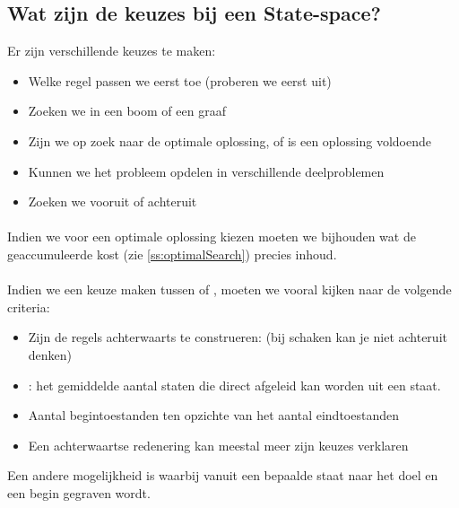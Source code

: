 \subsection{Wat zijn de keuzes bij een State-space?}
\label{ss:stateSpaceTradeOffs}
Er zijn verschillende keuzes te maken:
\begin{itemize}
 \item Welke regel passen we eerst toe (proberen we eerst uit)
 \item Zoeken we in een boom of een graaf
 \item Zijn we op zoek naar de optimale oplossing, of is een oplossing voldoende
 \item Kunnen we het probleem opdelen in verschillende deelproblemen
 \item Zoeken we vooruit of achteruit
\end{itemize}
\paragraph{}
Indien we voor een optimale oplossing kiezen moeten we bijhouden wat de geaccumuleerde kost (zie \ref{ss:optimalSearch}) precies inhoud.
\paragraph{}
Indien we een keuze maken tussen  of , moeten we vooral kijken naar de volgende criteria:
\begin{itemize}
 \item Zijn de regels achterwaarts te construeren: (bij schaken kan je niet achteruit denken)
 \item {}: het gemiddelde aantal staten die direct afgeleid kan worden uit een staat.
 \item Aantal begintoestanden ten opzichte van het aantal eindtoestanden
 \item Een achterwaartse redenering kan meestal meer zijn keuzes verklaren
\end{itemize}
Een andere mogelijkheid is  waarbij vanuit een bepaalde staat naar het doel en een begin gegraven wordt.
